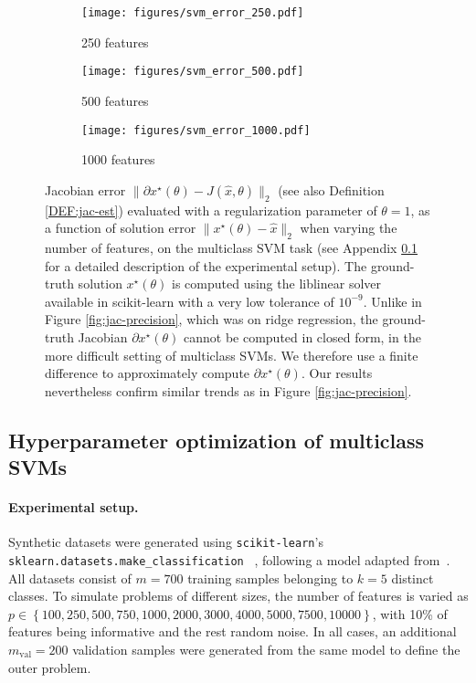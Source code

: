 \documentclass{article}
\begin{document}
\begin{figure}[p]
\begin{subfigure}{.33\textwidth}
  \centering
  \texttt{[image: figures/svm\_error\_250.pdf]}
  \caption{250 features}
  \label{fig:multiclass_svm_loss_jacobian_error_a}
\end{subfigure}
\begin{subfigure}{.33\textwidth}
  \centering
  \texttt{[image: figures/svm\_error\_500.pdf]}
  \caption{500 features}
  \label{fig:multiclass_svm_jacobian_error_b}
\end{subfigure}
\begin{subfigure}{.33\textwidth}
  \centering
  \texttt{[image: figures/svm\_error\_1000.pdf]}
  \caption{1000 features}
  \label{fig:multiclass_svm_jacobian_error_c}
\end{subfigure}
\caption{Jacobian error $\|\partial x^\star(\theta) - J(\hat x, \theta)\|_2$
(see also Definition \ref{DEF:jac-est}) evaluated with a regularization
parameter of $\theta=1$,
as a function of solution error
$\|x^\star(\theta) - \hat x\|_2$ when varying the number of features, on the
multiclass SVM task (see Appendix
\ref{appendix:multiclass_svm} for a detailed description of the experimental
setup). The ground-truth solution $x^\star(\theta)$ is
computed using the liblinear solver \cite{liblinear} available in scikit-learn
\cite{scikit-learn} with a very low tolerance of $10^{-9}$. 
Unlike in Figure \ref{fig:jac-precision}, which was on ridge regression, the ground-truth Jacobian $\partial
x^\star(\theta)$ cannot be computed in closed form, in the more difficult setting of multiclass SVMs. We therefore use
a finite difference to approximately compute $\partial x^\star(\theta)$.
Our results nevertheless confirm similar trends as in Figure
\ref{fig:jac-precision}.
}
\label{fig:multiclass_svm_jacobian_error}
\end{figure}

\subsection{Hyperparameter optimization of multiclass SVMs}
\label{appendix:multiclass_svm}

\paragraph{Experimental setup.}

Synthetic datasets were generated using \texttt{scikit-learn}'s
\texttt{sklearn.datasets.make\_classification} ~\cite{scikit-learn}, following
a model adapted from~\cite{guyon2003design}. All datasets consist of $m=700$ training samples belonging to $k=5$ distinct classes. To simulate problems of different sizes, the number of features is varied as $p \in \left\{100, 250, 500, 750, 1000, 2000, 3000, 4000, 5000, 7500, 10000\right\}$, with 10\% of features being informative and the rest random noise. In all cases, an additional $m_{\mathrm{val}}=200$ validation samples were generated from the same model to define the outer problem.
\end{document}
